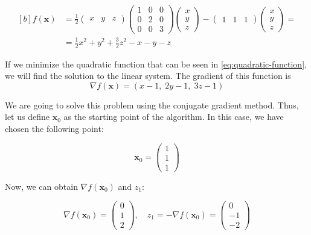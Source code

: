 \documentclass[11pt,a4paper]{article}
\begin{document}
\begin{equation}
  \begin{aligned}[b]
    f(\mathbf{x}) &=
    \frac{1}{2}
    \begin{pmatrix}
      x & y & z  
    \end{pmatrix}
    \begin{pmatrix}
      1 & 0 & 0 \\
      0 & 2 & 0 \\
      0 & 0 & 3
    \end{pmatrix}
    \begin{pmatrix}
      x \\
      y \\
      z
    \end{pmatrix}
    -
    \begin{pmatrix}
      1 & 1 & 1  
    \end{pmatrix}
    \begin{pmatrix}
      x \\
      y \\
      z
    \end{pmatrix}
    = \\
    &= \frac{1}{2}x^2 + y^2 + \frac{3}{2}z^2 - x - y - z
  \end{aligned}
  \label{eq:quadratic-function}
\end{equation}

If we minimize the quadratic function that can be seen in \eqref{eq:quadratic-function}, we will
find the solution to the linear system. The gradient of this function is
\begin{equation}
  \nabla f(\mathbf{x}) = (x - 1,\; 2y - 1,\; 3z - 1)
\end{equation}

We are going to solve this problem using the conjugate gradient method. Thus, let us
define $\mathbf{x}_0$ as the starting point of the algorithm. In this case, we
have chosen the following point:

\[
  \mathbf{x}_0 =
  \begin{pmatrix}
    1 \\
    1 \\
    1
  \end{pmatrix}   
\]

Now, we can obtain $\nabla f(\mathbf{x}_0)$ and $z_1$:

\[
  \nabla f(\mathbf{x}_0) =
  \begin{pmatrix}
    0 \\
    1 \\
    2
  \end{pmatrix}
  ,\quad
  z_1 = - \nabla f(\mathbf{x}_0) =
  \begin{pmatrix}
    0 \\
    -1 \\
    -2
  \end{pmatrix}
\]
\end{document}

